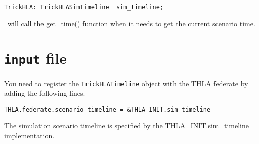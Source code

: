 \begin{verbatim}
TrickHLA: TrickHLASimTimeline  sim_timeline;
\end{verbatim}

\TrickHLA\ will call the get\_time() function when it needs to get the current
scenario time.

\section{{\tt input} file}

You need to register the {\tt TrickHLATimeline} object with the THLA 
federate by adding the following lines.

\begin{verbatim}
THLA.federate.scenario_timeline = &THLA_INIT.sim_timeline
\end{verbatim}

The simulation scenario timeline is specified by the THLA\_INIT.sim\_timeline
implementation.

